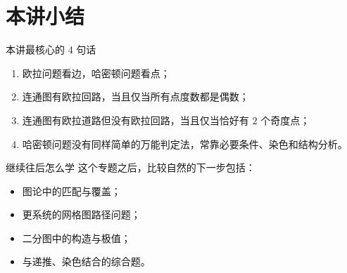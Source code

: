 \documentclass[11pt,a4paper,fontset=fandol]{ctexart}
\theoremstyle{formaltheorem}
\theoremstyle{formalexample}
\begin{document}
\section{本讲小结}

\begin{goalbox}{本讲最核心的 4 句话}
\begin{enumerate}
  \item 欧拉问题看边，哈密顿问题看点；
  \item 连通图有欧拉回路，当且仅当所有点度数都是偶数；
  \item 连通图有欧拉道路但没有欧拉回路，当且仅当恰好有 $2$ 个奇度点；
  \item 哈密顿问题没有同样简单的万能判定法，常靠必要条件、染色和结构分析。
\end{enumerate}
\end{goalbox}

\begin{skillbox}{继续往后怎么学}
这个专题之后，比较自然的下一步包括：
\begin{itemize}
  \item 图论中的匹配与覆盖；
  \item 更系统的网格图路径问题；
  \item 二分图中的构造与极值；
  \item 与递推、染色结合的综合题。
\end{itemize}
\end{skillbox}
\end{document}
